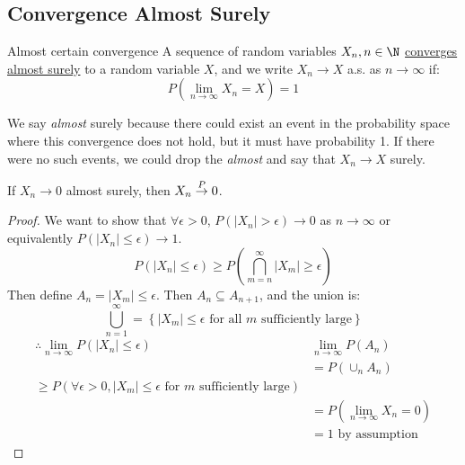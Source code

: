 \documentclass[../Main.tex]{subfiles}
\begin{document}
\subsection{Convergence Almost Surely}
\begin{definition}{Almost certain convergence}
    A sequence of random variables $X_n, n \in \N$ \underline{converges almost surely} to a random variable $X$, and we write $X_n \to X$ a.s. as $n \to \infty$ if:
    \begin{equation*}
        P\left(\lim_{n \to \infty} X_n = X\right) = 1
    \end{equation*}
\end{definition}
\begin{remark}
    We say \textit{almost} surely because there could exist an event in the probability space where this convergence does not hold, but it must have probability 1. If there were no such events, we could drop the \textit{almost} and say that $X_n \to X$ surely.
\end{remark}
\begin{lemma}
    If $X_n \to 0$ almost surely, then $X_n \overset{P}{\rightarrow} 0$.
    \label{lemASConvergeImpliesProbCoverge}
\end{lemma}
\begin{proof}
    We want to show that $\forall \epsilon > 0$, $P(|X_n| > \epsilon) \to 0$ as $n \to \infty$ or equivalently $P(|X_n| \leq \epsilon) \to 1$.
    \begin{equation*}
        P(|X_n| \leq \epsilon) \geq P\left(\bigcap_{m = n}^\infty {|X_m| \geq \epsilon}\right)
    \end{equation*}
    Then define $A_n = {|X_m| \leq \epsilon}$. Then $A_n \subseteq A_{n + 1}$, and the union is:
    \begin{equation*}
        \bigcup_{n = 1}^\infty = \left\{|X_m| \leq \epsilon \text{ for all } m \text{ sufficiently large}\right\}
    \end{equation*}
    \begin{align*}
        \therefore \lim_{n \to \infty} P(|X_n| \leq \epsilon) &\lim_{n \to \infty} P(A_n) \\
        &= P\left(\cup_n A_n\right) \\
        \geq P(\forall \epsilon > 0, |X_m| \leq \epsilon \text{ for } m \text{ sufficiently large}) \\
        &= P(\lim_{n \to \infty} X_n = 0) \\
        &= 1 \text{ by assumption}
    \end{align*}
\end{proof}
\end{document}
